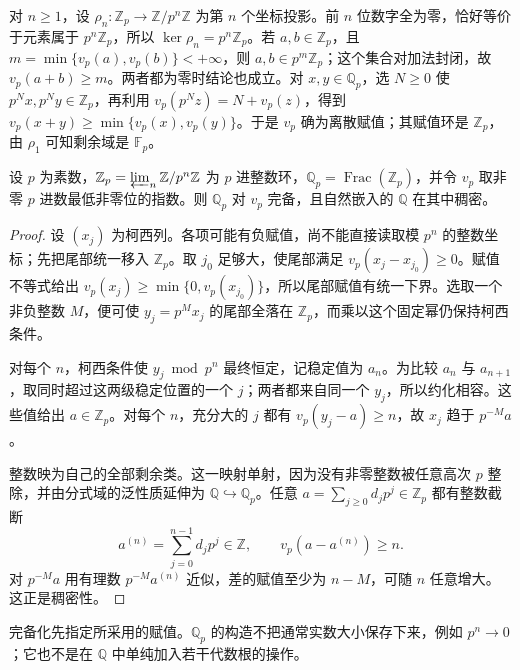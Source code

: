 \ProseParagraphBreak
对 \(n\geq1\)，设 \(\rho_n:\mathbb Z_p\rightarrow\mathbb Z/p^n\mathbb Z\) 为第 \(n\) 个坐标投影。前 \(n\) 位数字全为零，恰好等价于元素属于 \(p^n\mathbb Z_p\)，所以 \(\ker\rho_n=p^n\mathbb Z_p\)。若 \(a,b\in\mathbb Z_p\)，且 \(m=\min\{v_p(a),v_p(b)\}<+\infty\)，则 \(a,b\in p^m\mathbb Z_p\)；这个集合对加法封闭，故 \(v_p(a+b)\geq m\)。两者都为零时结论也成立。对 \(x,y\in\mathbb Q_p\)，选 \(N\geq0\) 使 \(p^Nx,p^Ny\in\mathbb Z_p\)，再利用 \(v_p(p^Nz)=N+v_p(z)\)，得到 \(v_p(x+y)\geq\min\{v_p(x),v_p(y)\}\)。于是 \(v_p\) 确为离散赋值；其赋值环是 \(\mathbb Z_p\)，由 \(\rho_1\) 可知剩余域是 \(\mathbb F_p\)。

\begin{proposition}\label{b1:prop:p-adic-completeness}
	设 \(p\) 为素数，\(\mathbb Z_p=\varprojlim_n\mathbb Z/p^n\mathbb Z\) 为 \(p\) 进整数环，\(\mathbb Q_p=\operatorname{Frac}(\mathbb Z_p)\)，并令 \(v_p\) 取非零 \(p\) 进数最低非零位的指数。则 \(\mathbb Q_p\) 对 \(v_p\) 完备，且自然嵌入的 \(\mathbb Q\) 在其中稠密。
\end{proposition}

\begin{proof}
	设 \((x_j)\) 为柯西列。各项可能有负赋值，尚不能直接读取模 \(p^n\) 的整数坐标；先把尾部统一移入 \(\mathbb Z_p\)。取 \(j_0\) 足够大，使尾部满足 \(v_p(x_j-x_{j_0})\geq0\)。赋值不等式给出 \(v_p(x_j)\geq\min\{0,v_p(x_{j_0})\}\)，所以尾部赋值有统一下界。选取一个非负整数 \(M\)，便可使 \(y_j=p^Mx_j\) 的尾部全落在 \(\mathbb Z_p\)，而乘以这个固定幂仍保持柯西条件。

	对每个 \(n\)，柯西条件使 \(y_j\bmod p^n\) 最终恒定，记稳定值为 \(a_n\)。为比较 \(a_n\) 与 \(a_{n+1}\)，取同时超过这两级稳定位置的一个 \(j\)；两者都来自同一个 \(y_j\)，所以约化相容。这些值给出 \(a\in\mathbb Z_p\)。对每个 \(n\)，充分大的 \(j\) 都有 \(v_p(y_j-a)\geq n\)，故 \(x_j\) 趋于 \(p^{-M}a\)。

	整数映为自己的全部剩余类。这一映射单射，因为没有非零整数被任意高次 \(p\) 整除，并由分式域的泛性质延伸为 \(\mathbb Q\hookrightarrow\mathbb Q_p\)。任意 \(a=\sum_{j\geq0}d_jp^j\in\mathbb Z_p\) 都有整数截断
	\[
		a^{(n)}=\sum_{j=0}^{n-1}d_jp^j\in\mathbb Z, \qquad v_p(a-a^{(n)})\geq n.
	\]
	对 \(p^{-M}a\) 用有理数 \(p^{-M}a^{(n)}\) 近似，差的赋值至少为 \(n-M\)，可随 \(n\) 任意增大。这正是稠密性。
\end{proof}

完备化先指定所采用的赋值。\(\mathbb Q_p\) 的构造不把通常实数大小保存下来，例如 \(p^n\rightarrow0\)；它也不是在 \(\mathbb Q\) 中单纯加入若干代数根的操作。

